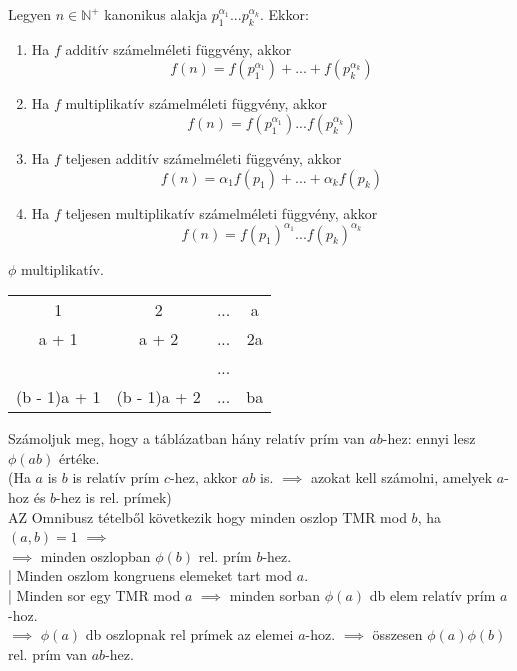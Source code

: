 \begin{frame}

\begin{tcolorbox}[title={Tétel: Számelméleti függvények}]
Legyen $n \in \mathbb{N}^+$ kanonikus alakja $p_1^{{\alpha}_1}...p_k^{{\alpha}_k}$. Ekkor:\\
\begin{enumerate}
\item Ha $f$ additív számelméleti függvény, akkor $$f(n) = f(p_1^{{\alpha}_1}) + ... + f(p_k^{{\alpha}_k})$$
\item Ha $f$ multiplikatív számelméleti függvény, akkor $$f(n) = f(p_1^{{\alpha}_1})...f(p_k^{{\alpha}_k})$$
\item Ha $f$ teljesen additív számelméleti függvény, akkor $$f(n) = {\alpha}_1f(p_1) + ... + {\alpha}_kf(p_k)$$
\item Ha $f$ teljesen multiplikatív számelméleti függvény, akkor $$f(n) = f(p_1)^{{\alpha}_1}...f(p_k)^{{\alpha}_k}$$
\end{enumerate}

\end{tcolorbox}

\end{frame}

\begin{frame}

\begin{tcolorbox}[title={Tétel: $\phi$ multiplikativitása}]
$\phi$ multiplikatív.
\end{tcolorbox}

\begin{tcolorbox}[title={Bizonyítás}]
\smallskip
\begin{tabular}{c c c c}
1 & 2 & ... & a \\
a + 1 & a + 2 & ... & 2a\\
 &  & ... &  \\
(b - 1)a + 1 & (b - 1)a + 2 & ... & ba
\end{tabular}
\smallskip
Számoljuk meg, hogy a táblázatban hány relatív prím van $ab$-hez: ennyi lesz ${\phi}(ab)$ értéke.\\
(Ha $a$ is $b$ is relatív prím $c$-hez, akkor $ab$ is. $\implies$ azokat kell számolni, amelyek $a$-hoz és $b$-hez is rel. prímek)\\
\smallskip
AZ Omnibusz tételből következik hogy minden oszlop TMR mod $b$, ha $(a, b) = 1$ $\implies$\\
$\implies$ minden oszlopban ${\phi}(b)$ rel. prím $b$-hez.\\
\smallskip
| Minden oszlom kongruens elemeket tart mod $a$.\\
| Minden sor egy TMR mod $a$ $\implies$ minden sorban ${\phi}(a)$ db elem relatív prím $a$-hoz.\\
$\implies$ ${\phi}(a)$ db oszlopnak rel prímek az elemei $a$-hoz. $\implies$ összesen ${\phi}(a){\phi}(b)$ rel. prím van $ab$-hez.

\end{tcolorbox}

\end{frame}

